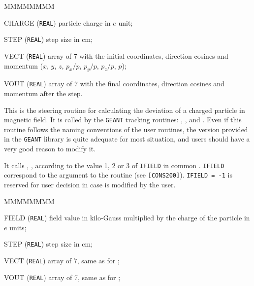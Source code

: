    
   

\begin{DLtt}{MMMMMMMM}
\item[CHARGE] ({\tt REAL}) particle charge in $e$ unit;
\item[STEP] ({\tt REAL}) step size in cm;
\item[VECT] ({\tt REAL}) array of 7 with the initial coordinates, direction 
cosines and momentum ($x$, $y$, $z$, $p_x/p$, $p_y/p$, $p_z/p$, $p$);
\item[VOUT] ({\tt REAL}) array of 7 with the final coordinates, direction 
cosines and momentum after the step.
\end{DLtt}
 
This is the steering routine for calculating the deviation of a charged
particle in magnetic field. It is called by the {\tt GEANT} tracking 
routines: , ,  and .
Even if this routine follows the naming conventions of the user routines,
the version provided in the {\tt GEANT} library is quite adequate for most
situation, and users should have a very good reason to modify it.
 
It calls , ,  according to the value
1, 2 or 3 of {\tt IFIELD} in common . {\tt IFIELD} correspond
to the argument to the  routine (see {\tt [CONS200]}).
{\tt IFIELD = -1} is reserved for user decision in case 
is modified by the user.


\begin{DLtt}{MMMMMMMM}
\item[FIELD] ({\tt REAL}) field value in kilo-Gauss multiplied by 
the charge of the particle in $e$ units;
\item[STEP] ({\tt REAL}) step size in cm;
\item[VECT] ({\tt REAL}) array of 7, same as for ;
\item[VOUT] ({\tt REAL}) array of 7, same as for ;
\end{DLtt}

